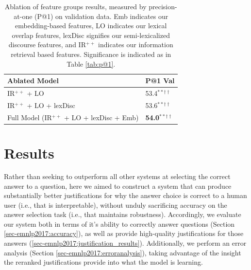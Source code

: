 \begin{table}[t!]
\begin{center}
\begin{footnotesize}
\begin{tabular}{ll}
\hline
 Ablated Model & P@1 Val \\ 
\hline
	IR$^{++}$ + LO 					&		53.4$^{**\dagger\dagger}$\\
	IR$^{++}$ + LO + lexDisc 	&		53.6$^{**\dagger\dagger}$ \\
    Full Model (IR$^{++}$ + LO + lexDisc + Emb)  &	{\bf 54.0}$^{**\dagger\dagger}$	\\
\end{tabular}
\end{footnotesize}
\caption{{ Ablation of feature groups results, measured by precision-at-one (P@1) on validation data.  Emb indicates our embedding-based features, LO indicates our lexical overlap features, lexDisc signifies our semi-lexicalized discourse features, and IR$^{++}$ indicates our information retrieval based features.  Significance is indicated as in Table \ref{tab:p@1}.}} 
\label{tab:ablation}
\end{center}
\end{table}

\section{Results}
\label{sec-emnlp2017:results}

Rather than seeking to outperform all other systems at selecting the correct answer to a question, here we aimed to construct a system  that can produce substantially better justifications for why the answer choice is correct to a human user (i.e., that is interpretable), without unduly sacrificing accuracy on the answer selection task (i.e., that maintains robustness).  Accordingly, we evaluate our system both in terms of it's ability to correctly answer questions (Section \ref{sec-emnlp2017:accuracy}), as well as provide high-quality justifications for those answers (\ref{sec-emnlp2017:justification_results}).  Additionally, we perform an error analysis (Section \ref{sec-emnlp2017:erroranalysis}), taking advantage of the insight the reranked justifications provide into what the model is learning.

